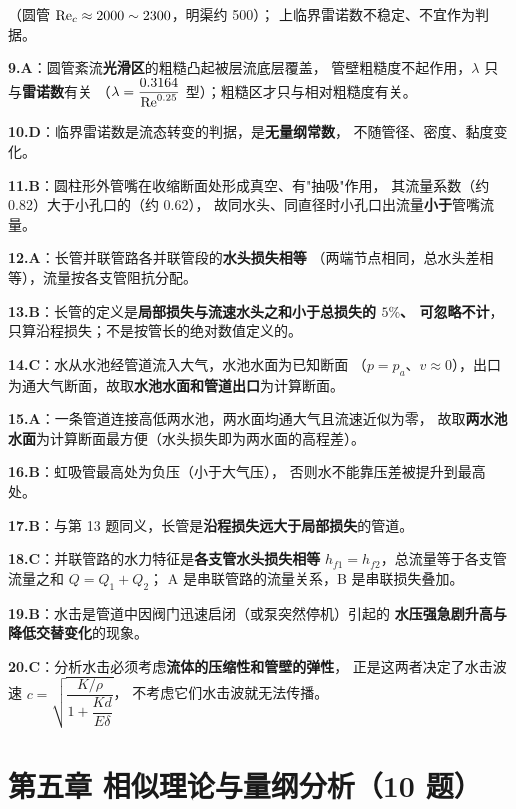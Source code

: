 \begin{tishi}
\begin{xiaowen}
（圆管 $\mathrm{Re}_c\approx2000\sim2300$，明渠约 500）；
上临界雷诺数不稳定、不宜作为判据。
\item \textbf{9.A}：圆管紊流\textbf{光滑区}的粗糙凸起被层流底层覆盖，
管壁粗糙度不起作用，$\lambda$ 只与\textbf{雷诺数}有关
（$\lambda=\dfrac{0.3164}{\mathrm{Re}^{0.25}}$ 型）；粗糙区才只与相对粗糙度有关。
\item \textbf{10.D}：临界雷诺数是流态转变的判据，是\textbf{无量纲常数}，
不随管径、密度、黏度变化。
\item \textbf{11.B}：圆柱形外管嘴在收缩断面处形成真空、有"抽吸"作用，
其流量系数（约 0.82）大于小孔口的（约 0.62），
故同水头、同直径时小孔口出流量\textbf{小于}管嘴流量。
\item \textbf{12.A}：长管并联管路各并联管段的\textbf{水头损失相等}
（两端节点相同，总水头差相等），流量按各支管阻抗分配。
\item \textbf{13.B}：长管的定义是\textbf{局部损失与流速水头之和小于总损失的 $5\%$、
可忽略不计}，只算沿程损失；不是按管长的绝对数值定义的。
\item \textbf{14.C}：水从水池经管道流入大气，水池水面为已知断面
（$p=p_a$、$v\approx0$），出口为通大气断面，故取\textbf{水池水面和管道出口}为计算断面。
\item \textbf{15.A}：一条管道连接高低两水池，两水面均通大气且流速近似为零，
故取\textbf{两水池水面}为计算断面最方便（水头损失即为两水面的高程差）。
\item \textbf{16.B}：虹吸管最高处为负压（小于大气压），
否则水不能靠压差被提升到最高处。
\item \textbf{17.B}：与第 13 题同义，长管是\textbf{沿程损失远大于局部损失}的管道。
\item \textbf{18.C}：并联管路的水力特征是\textbf{各支管水头损失相等}
$h_{f1}=h_{f2}$，总流量等于各支管流量之和 $Q=Q_1+Q_2$；
A 是串联管路的流量关系，B 是串联损失叠加。
\item \textbf{19.B}：水击是管道中因阀门迅速启闭（或泵突然停机）引起的
\textbf{水压强急剧升高与降低交替变化}的现象。
\item \textbf{20.C}：分析水击必须考虑\textbf{流体的压缩性和管壁的弹性}，
正是这两者决定了水击波速 $c=\sqrt{\dfrac{K/\rho}{1+\dfrac{Kd}{E\delta}}}$，
不考虑它们水击波就无法传播。
\end{xiaowen}
\end{tishi}

\section*{第五章 相似理论与量纲分析（10 题）}

